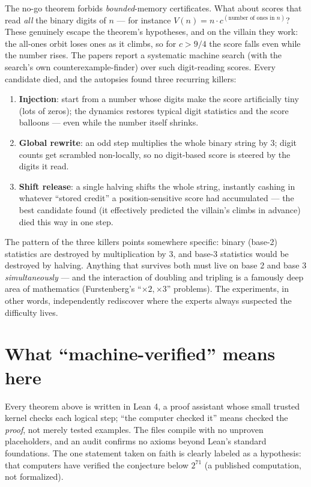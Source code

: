 \documentclass[11pt]{article}
\begin{document}
The no-go theorem forbids \emph{bounded}-memory certificates. What
about scores that read \emph{all} the binary digits of $n$ --- for
instance $V(n) = n \cdot c^{(\text{number of ones in } n)}$? These
genuinely escape the theorem's hypotheses, and on the villain they
work: the all-ones orbit loses ones as it climbs, so for $c > 9/4$ the
score falls even while the number rises. The papers report a systematic
machine search (with the search's own counterexample-finder) over such
digit-reading scores. Every candidate died, and the autopsies found
three recurring killers:
\begin{enumerate}
\item \textbf{Injection}: start from a number whose digits make the
score artificially tiny (lots of zeros); the dynamics restores typical
digit statistics and the score balloons --- even while the number
itself shrinks.
\item \textbf{Global rewrite}: an odd step multiplies the whole binary
string by 3; digit counts get scrambled non-locally, so no digit-based
score is steered by the digits it read.
\item \textbf{Shift release}: a single halving shifts the whole string,
instantly cashing in whatever ``stored credit'' a position-sensitive
score had accumulated --- the best candidate found (it effectively
predicted the villain's climbs in advance) died this way in one step.
\end{enumerate}
The pattern of the three killers points somewhere specific: binary
(base-2) statistics are destroyed by multiplication by 3, and base-3
statistics would be destroyed by halving. Anything that survives both
must live on base 2 and base 3 \emph{simultaneously} --- and the
interaction of doubling and tripling is a famously deep area of
mathematics (Furstenberg's ``$\times 2, \times 3$'' problems). The
experiments, in other words, independently rediscover where the experts
always suspected the difficulty lives.

\section{What ``machine-verified'' means here}

Every theorem above is written in Lean 4, a proof assistant whose small
trusted kernel checks each logical step; ``the computer checked it''
means checked the \emph{proof}, not merely tested examples. The files
compile with no unproven placeholders, and an audit confirms no axioms
beyond Lean's standard foundations. The one statement taken on faith is
clearly labeled as a hypothesis: that computers have verified the
conjecture below $2^{71}$ (a published computation, not formalized).
\end{document}
